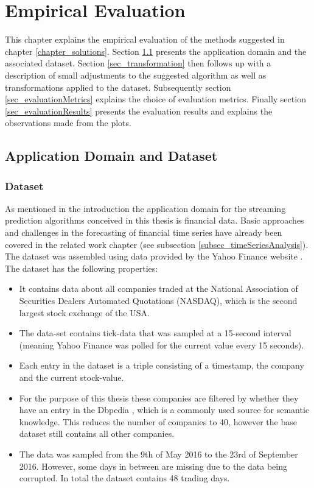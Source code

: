 \chapter{Empirical Evaluation}
\label{chapter_evaluation}

\ifpdf
    \graphicspath{{Chapter6/Figs/Raster/}{Chapter6/Figs/PDF/}{Chapter6/Figs/}}
\else
    \graphicspath{{Chapter6/Figs/Vector/}{Chapter6/Figs/}}
\fi

This chapter explains the empirical evaluation of the methods suggested in chapter \ref{chapter_solutions}. Section \ref{sec_applicationDomain} presents the application domain and the associated dataset. Section \ref{sec_transformation} then follows up with a description of small adjustments to the suggested algorithm as well as transformations applied to the dataset. Subsequently section \ref{sec_evaluationMetrics} explains the choice of evaluation metrics. Finally section \ref{sec_evaluationResults} presents the evaluation results and explains the observations made from the plots.

\section{Application Domain and Dataset}
\label{sec_applicationDomain}

\subsection{Dataset}
As mentioned in the introduction the application domain for the streaming prediction algorithms conceived in this thesis is financial data. Basic approaches and challenges in the forecasting of financial time series have already been covered in the related work chapter (see subsection \ref{subsec_timeSeriesAnalysis}). The dataset was assembled using data provided by the Yahoo Finance website \cite{yahooFinance}. The dataset has the following properties:
\begin{itemize}
	\item It contains data about all companies traded at the National Association of Securities Dealers Automated Quotations (NASDAQ), which is the second largest stock exchange of the USA.
	\item The data-set contains tick-data that was sampled at a 15-second interval (meaning Yahoo Finance was polled for the current value every 15 seconds).
	\item Each entry in the dataset is a triple consisting of a timestamp, the company and the current stock-value.
	\item For the purpose of this thesis these companies are filtered by whether they have an entry in the Dbpedia \cite{auer2007dbpedia}, which is a commonly used source for semantic knowledge. This reduces the number of companies to 40, however the base dataset still contains all other companies.
	\item The data was sampled from the 9th of May 2016 to the 23rd of September 2016. However, some days in between are missing due to the data being corrupted. In total the dataset contains 48 trading days.
\end{itemize}

